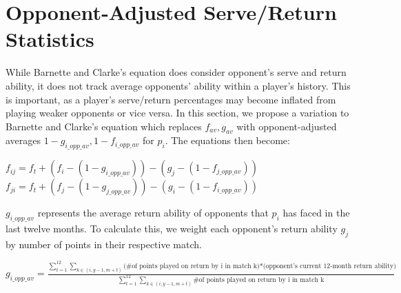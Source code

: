 \documentclass[chapterprefix=false]{report}
\begin{document}




\section{Opponent-Adjusted Serve/Return Statistics}

While Barnette and Clarke's equation does consider opponent's serve and return ability, it does not track average opponents' ability within a player's history. This is important, as a player's serve/return percentages may become inflated from playing weaker opponents or vice versa. In this section, we propose a variation to Barnette and Clarke's equation which replaces $f_{av},g_{av}$ with opponent-adjusted averages $1-g_{i\_opp\_av},1-f_{i\_opp\_av}$ for $p_i$. The equations then become:

\begin{center}
$f_{ij} = f_t + (f_i-(1-g_{i\_opp\_av}))-(g_j-(1-f_{j\_opp\_av}))$
$f_{ji} = f_t + (f_j-(1-g_{j\_opp\_av}))-(g_i-(1-f_{i\_opp\_av}))$
\end{center}

$g_{i\_opp\_av}$ represents the average return ability of opponents that $p_i$ has faced in the last twelve months. To calculate this, we weight each opponent's return ability $g_j$ by number of points in their respective match.

$g_{i\_opp\_av} = \frac{\sum_{t=1}^{12}\sum_{k \in (i,y-1,m+t)}{\text{(\# of points played on return by i in match k)*(opponent's current 12-month return ability)}}}{\sum_{t=1}^{12}\sum_{k \in (i,y-1,m+t)}\text{\# of points played on return by i in match k}}$
\end{document}
